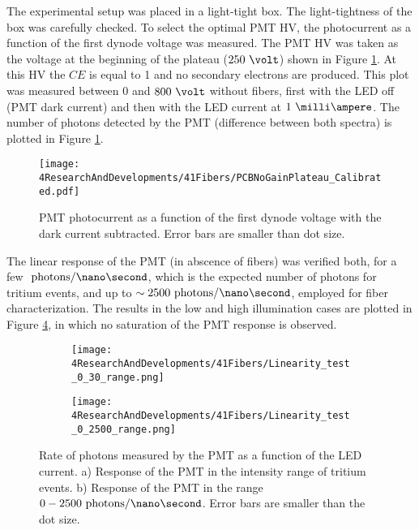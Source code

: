The experimental setup was placed in a light-tight box. The light-tightness of the box was carefully checked. To select the optimal PMT HV, the photocurrent as a function of the first dynode voltage was measured. The PMT HV was taken as the voltage at the beginning of the plateau ($250~\volt$) shown in Figure \ref{fig:PlateauNoGainPMT}. At this HV the $CE$ is equal to 1 and no secondary electrons are produced. This plot was measured between $0$ and $800~\volt$ without fibers, first with the LED off (PMT dark current) and then with the LED current at $1~\milli\ampere$. The number of photons detected by the PMT (difference between both spectra) is plotted in Figure \ref{fig:PlateauNoGainPMT}. 

\begin{figure}[h]
\centering
\texttt{[image: 4ResearchAndDevelopments/41Fibers/PCBNoGainPlateau\_Calibrated.pdf]}
\caption{PMT photocurrent as a function of the first dynode voltage with the dark current subtracted. Error bars are smaller than dot size.\label{fig:PlateauNoGainPMT}}
\end{figure}

The linear response of the PMT (in abscence of fibers) was verified both, for a few $~\text{photons}/\nano\second$, which is the expected number of photons for tritium events, and up to $\sim 2500~\text{photons}/\nano\second$, employed for fiber characterization. The results in the low and high illumination cases are plotted in Figure \ref{fig:LinearityRangesOfPMT}, in which no saturation of the PMT response is observed.

\begin{figure}
\centering
    \begin{subfigure}[b]{1\textwidth}
    \centering
    \texttt{[image: 4ResearchAndDevelopments/41Fibers/Linearity\_test\_0\_30\_range.png]}  
    \caption{\label{subfig:LinearityTritiumRange}}
    \end{subfigure}
    \hfill
    \begin{subfigure}[b]{1\textwidth}
    \centering
    \texttt{[image: 4ResearchAndDevelopments/41Fibers/Linearity\_test\_0\_2500\_range.png]}  
    \caption{\label{subfig:LinearityStudyRange}}
    \end{subfigure}
 \caption{Rate of photons measured by the PMT as a function of the LED current. a) Response of the PMT in the intensity range of tritium events. b) Response of the PMT in the range $0-2500~\text{photons}/\nano\second$. Error bars are smaller than the dot size.}
 \label{fig:LinearityRangesOfPMT}
\end{figure}